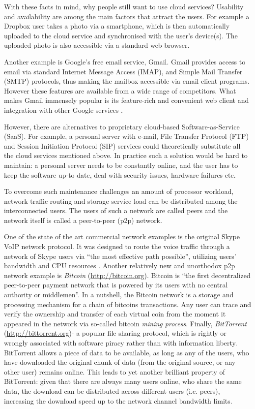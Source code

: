 With these facts in mind, why people still want to use cloud services?
Usability and availability are among the main factors that attract the users.
For example a Dropbox
user takes a photo via a smartphone, which is then automatically
uploaded to the cloud service and synchronised with the user's device(s).
The uploaded photo is also accessible via a standard web browser.

Another example is Google's free email service, Gmail.
Gmail provides access to email via
standard Internet Message Access (IMAP), and Simple Mail
Transfer (SMTP) protocols, thus making the mailbox accessible
via email client programs. However these features are available from
a wide range of competitors. What makes Gmail immensely popular
is its feature-rich and convenient web client and integration with
other Google services \citep{gmail-popularity}.

However, there are alternatives to proprietary cloud-based
Software-as-Service (SaaS).
For example, a personal server with e-mail,
File Transfer Protocol (FTP) and
Session Initiation Protocol (SIP)
services could theoretically substitute all the cloud services
mentioned above. In practice such a solution would be hard to maintain:
a personal server needs to be constantly online, and the user has to keep
the software up-to date, deal with security issues, hardware failures
etc.

To overcome such maintenance challenges an amount of
processor workload, network traffic routing and storage service load
can be distributed among the interconnected users.
The users of such a network are called peers and the network
itself is called a peer-to-peer (p2p) network.

One of the state of the art commercial \pp network examples is the
original Skype VoIP network protocol. It was designed to route the
voice traffic through a network of Skype users via
``the most effective path possible'', utilizing
users' bandwidth and CPU resources \citep{skype-p2p}.
Another relatively new and unorthodox p2p network example is
\emph{Bitcoin} (\url{http://bitcoin.org}). Bitcoin is
``the first decentralized peer-to-peer payment network that
is powered by its users with no central authority or middlemen''.
In a nutshell, the Bitcoin network is a storage and processing
mechanism for a chain of bitcoins transactions. Any user can
trace and verify the ownership and transfer of each virtual
coin from the moment it appeared in the network via
so-called bitcoin \emph{mining process}.
Finally, \emph{BitTorrent} (\url{http://bittorrent.org})-
a popular file sharing protocol, which is
rightly or wrongly associated with software piracy rather than
with information liberty. BitTorrent allows a piece of data to be
available, as long as any of the users, who have downloaded the original
chunk of data (from the original source, or any other user) remains
online. This leads to yet another brilliant property of BitTorrent:
given that there are always many users online, who share the same data,
the download can be distributed across different users (i.e. peers),
increasing the download speed up to the network channel bandwidth limits.

